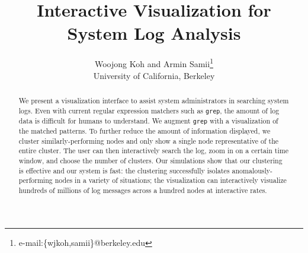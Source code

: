 \documentclass[conference]{style/acmsiggraph}
\title{Interactive Visualization for System Log Analysis}
\author{Woojong Koh and Armin Samii\thanks{e-mail:\{wjkoh,samii\}@berkeley.edu}\\University of California, Berkeley}
\begin{document}

\maketitle

\begin{abstract}

We present a visualization interface to assist system administrators in searching system logs.
Even with current regular expression matchers such as \texttt{grep}, the amount of log data is difficult for humans to understand.
We augment \texttt{grep} with a visualization of the matched patterns.
To further reduce the amount of information displayed, we cluster similarly-performing nodes and only show a single node representative of the entire cluster.
The user can then interactively search the log, zoom in on a certain time window, and choose the number of clusters.
Our simulations show that our clustering is effective and our system is fast:
the clustering successfully isolates anomalously-performing nodes in a variety of situations;
the visualization can interactively visualize hundreds of millions of log messages across a hundred nodes at interactive rates.

\end{abstract}

\end{document}
